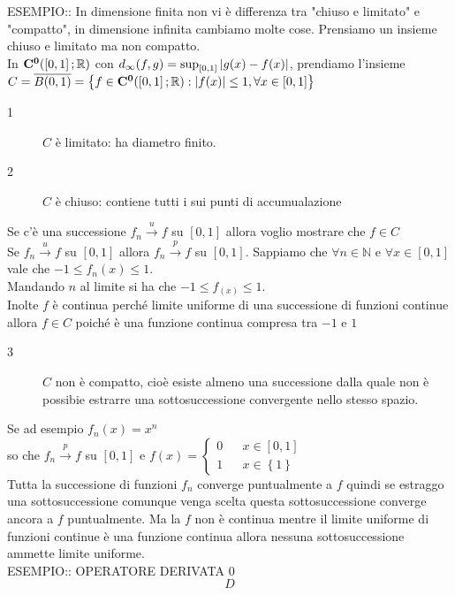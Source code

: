 ESEMPIO:: In dimensione finita non vi è differenza tra "chiuso e limitato" e "compatto", in dimensione infinita cambiamo molte cose.
Prensiamo un insieme chiuso e limitato ma non compatto.\\
In $\mathbf{C^{0}}(\left[0,1\right]; \mathbb{R})$ con $d_\infty(f,g)=\sup_{\left[0,1\right]}\left|g(x)-f(x)\right|$, prendiamo l'insieme $C=\overline{B(0,1)}=\left\{f\in \mathbf{C^{0}}(\left[0,1\right]; \mathbb{R}):\left|f(x)\right|\le 1, \forall x \in\left[0,1\right]\right\}$
\begin{description}
	\item[1] $C$ è limitato: ha diametro finito.
	\item[2] $C$ è chiuso: contiene tutti i sui punti di accumualazione
\end{description}
Se c'è una successione $f_n\overset{u}{\to}f$ su $\left[0,1\right]$ allora voglio mostrare che $f\in C$\\
Se $f_n\overset{u}{\to}f$ su $\left[0,1\right]$ allora $f_n\overset{p}{\to}f$ su $\left[0,1\right]$.
Sappiamo che $\forall n\in\mathbb{N}$ e $\forall x\in \left[0,1\right]$ vale che $-1\le f_n(x)\le 1$.\\
Mandando $n$ al limite si ha che $-1\le f_(x)\le 1$.\\
Inolte $f$ è continua perché limite uniforme di una successione di funzioni continue allora $f\in C$ poiché è una funzione continua compresa tra $-1$ e $1$
\begin{description}
	\item[3] $C$ non è compatto, cioè esiste almeno una successione dalla quale non è possibie estrarre una sottosuccessione convergente nello stesso spazio.
\end{description}
Se ad esempio $f_n(x) = x^n$\\
so che $f_n\overset{p}{\to}f$ su $\left[0,1\right]$ e $f(x)=\left\{\begin{matrix}0&&x\in\left[0,1\right]\\1&&x\in\left\{1\right\}\end{matrix}\right.$\\
Tutta la successione di funzioni $f_n$ converge puntualmente a $f$ quindi se estraggo una sottosuccessione comunque venga scelta questa sottosuccessione converge ancora a $f$ puntualmente. Ma la $f$ non è continua mentre il limite uniforme di funzioni continue è una funzione continua allora nessuna sottosuccessione ammette limite uniforme.\\

ESEMPIO:: OPERATORE DERIVATA 0\\
$$D$$

